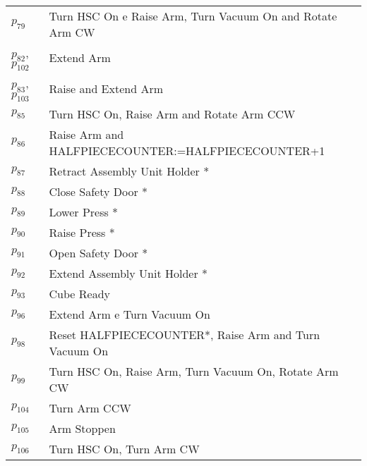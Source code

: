 \begin{longtable}{m{5cm}m{5cm}}
\hyperlink{completeNet:p79}{\hypertarget{completeTable:p79}{$p_{79}$}} & Turn HSC On e Raise Arm, Turn Vacuum On and Rotate Arm CW\\
\hyperlink{completeNet:p82}{\hypertarget{completeTable:p82}{$p_{82}$}}, \hyperlink{completeNet:p102}{\hypertarget{completeTable:p102}{$p_{102}$}} & Extend Arm\\
\hyperlink{completeNet:p83}{\hypertarget{completeTable:p83}{$p_{83}$}}, \hyperlink{completeNet:p103}{\hypertarget{completeTable:p103}{$p_{103}$}} & Raise and Extend Arm\\
\hyperlink{completeNet:p85}{\hypertarget{completeTable:p85}{$p_{85}$}} & Turn HSC On, Raise Arm and Rotate Arm CCW\\
\hyperlink{completeNet:p86}{\hypertarget{completeTable:p86}{$p_{86}$}} & Raise Arm and HALFPIECECOUNTER:=HALFPIECECOUNTER+1\\
\hyperlink{completeNet:p87}{\hypertarget{completeTable:p87}{$p_{87}$}} & Retract Assembly Unit Holder *\\
\hyperlink{completeNet:p88}{\hypertarget{completeTable:p88}{$p_{88}$}} & Close Safety Door *\\
\hyperlink{completeNet:p89}{\hypertarget{completeTable:p89}{$p_{89}$}} & Lower Press *\\
\hyperlink{completeNet:p90}{\hypertarget{completeTable:p90}{$p_{90}$}} & Raise Press *\\
\hyperlink{completeNet:p91}{\hypertarget{completeTable:p91}{$p_{91}$}} & Open Safety Door *\\
\hyperlink{completeNet:p92}{\hypertarget{completeTable:p92}{$p_{92}$}} & Extend Assembly Unit Holder *\\
\hyperlink{completeNet:p93}{\hypertarget{completeTable:p93}{$p_{93}$}} & Cube Ready\\
\hyperlink{completeNet:p96}{\hypertarget{completeTable:p96}{$p_{96}$}} & Extend Arm e Turn Vacuum On\\
\hyperlink{completeNet:p98}{\hypertarget{completeTable:p98}{$p_{98}$}} & Reset HALFPIECECOUNTER*, Raise Arm and Turn Vacuum On\\
\hyperlink{completeNet:p99}{\hypertarget{completeTable:p99}{$p_{99}$}} & Turn HSC On, Raise Arm, Turn Vacuum On, Rotate Arm CW\\
\hyperlink{completeNet:p104}{\hypertarget{completeTable:p104}{$p_{104}$}} & Turn Arm CCW\\
\hyperlink{completeNet:p105}{\hypertarget{completeTable:p105}{$p_{105}$}} & Arm Stoppen\\
\hyperlink{completeNet:p106}{\hypertarget{completeTable:p106}{$p_{106}$}} & Turn HSC On, Turn Arm CW\\

\end{longtable}
